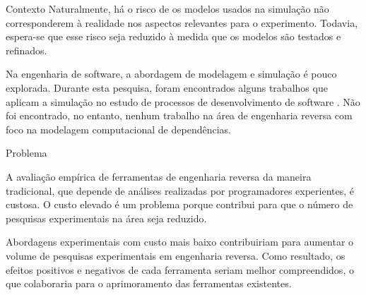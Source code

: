 \begin{section}{Contexto}
		Naturalmente, há o risco de os modelos usados na simulação não corresponderem à realidade nos aspectos relevantes para o experimento. Todavia, espera-se que esse risco seja reduzido à medida que os modelos são testados e refinados.

		Na engenharia de software, a abordagem de modelagem e simulação é pouco explorada. Durante esta pesquisa, foram encontrados alguns trabalhos que aplicam a simulação no estudo de processos de desenvolvimento de software \cite{Stopford2008}. Não foi encontrado, no entanto, nenhum trabalho na área de engenharia reversa com foco na modelagem computacional de dependências.
		
\end{section}

\begin{section}{Problema}
	
	A avaliação empírica de ferramentas de engenharia reversa da maneira tradicional, que depende de análises realizadas por programadores experientes, é custosa. O custo elevado é um problema porque contribui para que o número de pesquisas experimentais na área seja reduzido. 
	
  Abordagens experimentais com custo mais baixo contribuiriam para aumentar o volume de pesquisas experimentais em engenharia reversa. Como resultado, os efeitos positivos e negativos de cada ferramenta seriam melhor compreendidos, o que colaboraria para o aprimoramento das ferramentas existentes.
	
	
\end{section}

